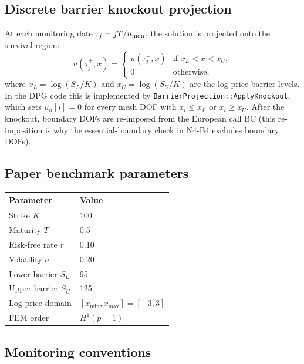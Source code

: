 \documentclass[11pt,a4paper]{article}
\newcommand{\SL}{S_L}
\newcommand{\SU}{S_U}
\begin{document}
\subsection{Discrete barrier knockout projection}

At each monitoring date $\tau_j = jT/n_{\rm mon}$, the solution is
projected onto the survival region:
\begin{equation}
  u(\tau_j^+, x) =
  \begin{cases}
    u(\tau_j^-, x) & \text{if } x_L < x < x_U, \\
    0              & \text{otherwise,}
  \end{cases}
  \label{eq:knockout}
\end{equation}
where $x_L = \log(\SL/K)$ and $x_U = \log(\SU/K)$ are the log-price
barrier levels.  In the DPG code this is implemented by
\texttt{BarrierProjection::ApplyKnockout}, which sets $u_h[i] = 0$ for
every mesh DOF with $x_i \le x_L$ or $x_i \ge x_U$.
After the knockout, boundary DOFs are re-imposed from the European call
BC (this re-imposition is why the essential-boundary check in N4-B4
excludes boundary DOFs).

\subsection{Paper benchmark parameters}

\begin{center}
\begin{tabular}{ll}
\toprule
Parameter & Value \\
\midrule
Strike $K$             & 100 \\
Maturity $T$           & 0.5 \\
Risk-free rate $r$     & 0.10 \\
Volatility $\sigma$    & 0.20 \\
Lower barrier $\SL$    & 95 \\
Upper barrier $\SU$    & 125 \\
Log-price domain       & $[x_{\min}, x_{\max}] = [-3, 3]$ \\
FEM order              & $H^1(p=1)$ \\
\bottomrule
\end{tabular}
\end{center}

\subsection{Monitoring conventions}
\end{document}
